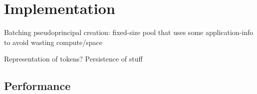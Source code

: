 \section{Implementation}
    
Batching pseudoprincipal creation: fixed-size pool that uses some application-info to avoid wasting
compute/space

Representation of tokens? Persistence of stuff

\subsection{Performance}

